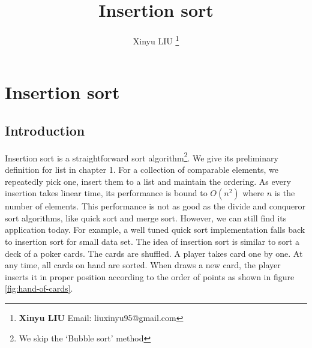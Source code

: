 \documentclass[b5paper]{article}
\begin{document}
\title{Insertion sort}

\author{Xinyu LIU
\thanks{{\bfseries Xinyu LIU} \newline
  Email: liuxinyu95@gmail.com \newline}
  }

\maketitle
\fi


\ifx\wholebook\relax
\chapter{Insertion sort}
\fi

\section{Introduction}
\label{sec:isort-introduction} 

Insertion sort is a straightforward sort algorithm\footnote{We skip the `Bubble sort' method}. We give its preliminary definition for list in chapter 1. For a collection of comparable elements, we repeatedly pick one, insert them to a list and maintain the ordering. As every insertion takes linear time, its performance is bound to $O(n^2)$ where $n$ is the number of elements. This performance is not as good as the divide and conqueror sort algorithms, like quick sort and merge sort. However, we can still find its application today. For example, a well tuned quick sort implementation falls back to insertion sort for small data set. The idea of insertion sort is similar to sort a deck of a poker cards\cite{CLRS}. The cards are shuffled. A player takes card one by one. At any time, all cards on hand are sorted. When draws a new card, the player inserts it in proper position according to the order of points as shown in figure \ref{fig:hand-of-cards}.
\end{document}
